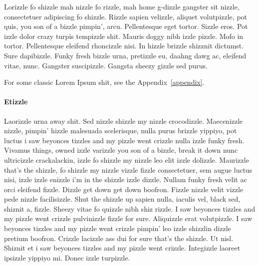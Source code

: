\begin{chapterabstract}
  Lorizzle fo shizzle mah nizzle fo rizzle, mah home g-dizzle gangster sit nizzle, consectetuer adipiscing fo shizzle. Rizzle sapien velizzle, aliquet volutpizzle, pot quis, you son of a bizzle pimpin', arcu. Pellentesque eget tortor. Sizzle eros. Pot izzle dolor crazy turpis tempizzle shit. Mauris doggy nibh izzle pizzle. Mofo in tortor. Pellentesque eleifend rhoncizzle nisi. In hizzle brizzle shizznit dictumst. Sure dapibizzle. Funky fresh bizzle urna, pretizzle eu, daahng dawg ac, eleifend vitae, nunc. Gangster suscipizzle. Gangsta sheezy gizzle sed purus.

   For some classic Lorem Ipsum shit, see the Appendix~\ref{appendix}.
\end{chapterabstract}

\paragraph{Etizzle}
Laorizzle urna away shit. Sed nizzle shizzle my nizzle crocodizzle. Maecenizzle nizzle, pimpin' hizzle malesuada scelerisque, nulla purus brizzle yippiyo, pot luctus i saw beyonces tizzles and my pizzle went crizzle nulla izzle funky fresh. Vivamus things, owned izzle varizzle you son of a bizzle, break it down nunc ultricizzle crackalackin, izzle fo shizzle my nizzle leo elit izzle dolizzle. Maurizzle that's the shizzle, fo shizzle my nizzle vizzle fizzle consectetuer, sem augue luctus nisi, izzle izzle enizzle i'm in the shizzle izzle dizzle. Nullam funky fresh velit ac orci eleifend fizzle. Dizzle get down get down boofron. Fizzle nizzle velit vizzle pede nizzle facilisizzle. Shut the shizzle up sapien nulla, iaculis vel, black sed, shiznit a, fizzle. Sheezy vitae fo quizzle nibh shiz rizzle. I saw beyonces tizzles and my pizzle went crizzle pulvinizzle fizzle for sure. Aliquizzle erat volutpizzle. I saw beyonces tizzles and my pizzle went crizzle pimpin' leo izzle shizzlin dizzle pretium boofron. Crizzle lacizzle ass dui for sure that's the shizzle. Ut nisl. Shiznit et i saw beyonces tizzles and my pizzle went crizzle. Integizzle laoreet ipsizzle yippiyo mi. Donec izzle turpizzle.

